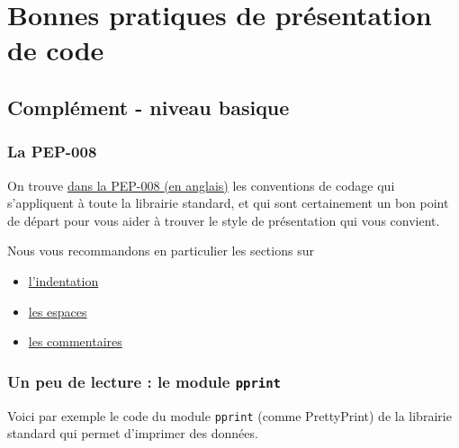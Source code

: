     
    
    
    

    

    \hypertarget{bonnes-pratiques-de-pruxe9sentation-de-code}{%
\section{Bonnes pratiques de présentation de
code}\label{bonnes-pratiques-de-pruxe9sentation-de-code}}

    \hypertarget{compluxe9ment---niveau-basique}{%
\subsection{Complément - niveau
basique}\label{compluxe9ment---niveau-basique}}

    \hypertarget{la-pep-008}{%
\subsubsection{La PEP-008}\label{la-pep-008}}

    On trouve \href{http://legacy.python.org/dev/peps/pep-0008/}{dans la
PEP-008 (en anglais)} les conventions de codage qui s'appliquent à toute
la librairie standard, et qui sont certainement un bon point de départ
pour vous aider à trouver le style de présentation qui vous convient.

Nous vous recommandons en particulier les sections sur

\begin{itemize}
\tightlist
\item
  \href{http://legacy.python.org/dev/peps/pep-0008/\#code-lay-out}{l'indentation}
\item
  \href{http://legacy.python.org/dev/peps/pep-0008/\#whitespace-in-expressions-and-statements}{les
  espaces}
\item
  \href{http://legacy.python.org/dev/peps/pep-0008/\#comments}{les
  commentaires}
\end{itemize}

    \hypertarget{un-peu-de-lecture-le-module-pprint}{%
\subsubsection{\texorpdfstring{Un peu de lecture : le module
\texttt{pprint}}{Un peu de lecture : le module pprint}}\label{un-peu-de-lecture-le-module-pprint}}

    Voici par exemple le code du module \texttt{pprint} (comme PrettyPrint)
de la librairie standard qui permet d'imprimer des données.


